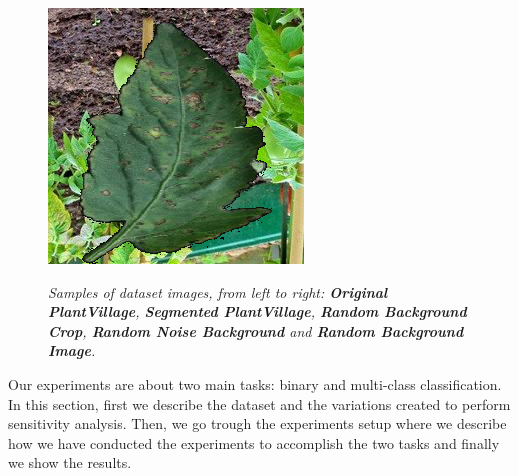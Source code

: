\begin{figure}
\begin{center}
{			\includegraphics[scale=0.2241]{./images/random_backgorund}
		}
		\begin{center}
			\caption{\textit{Samples of dataset images, from left to right: \textbf{Original PlantVillage}, \textbf{Segmented PlantVillage}, \textbf{Random Background Crop}, \textbf{Random Noise Background} and \textbf{Random Background Image}.}}
			\label{fig:samples}
		\end{center}
		\vspace{-32pt}
	\end{center}
\end{figure}
Our experiments are about two main tasks: binary and multi-class classification. In this section, first we describe the dataset and the variations created to perform sensitivity analysis. Then, we go trough the experiments setup where we describe how we have conducted the experiments to accomplish the two tasks and finally we show the results.

